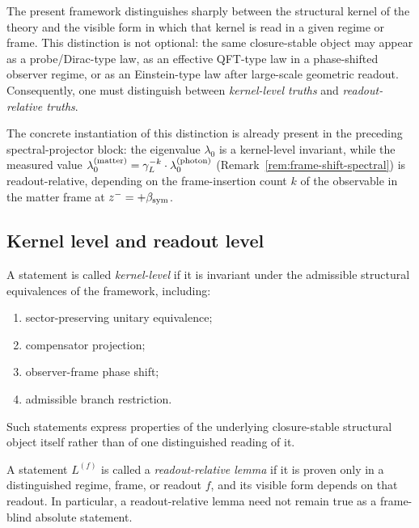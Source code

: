 The present framework distinguishes sharply between the structural kernel
of the theory and the visible form in which that kernel is read in a
given regime or frame. This distinction is not optional: the same
closure-stable object may appear as a probe/Dirac-type law, as an
effective QFT-type law in a phase-shifted observer regime, or as an
Einstein-type law after large-scale geometric readout. Consequently,
one must distinguish between \emph{kernel-level truths} and
\emph{readout-relative truths}.

The concrete instantiation of this distinction is already present in the
preceding spectral-projector block: the eigenvalue $\lambda_0$ is a
kernel-level invariant, while the measured value
$\lambda_0^{(\mathrm{matter})} = \gamma_L^{-k}\cdot\lambda_0^{(\mathrm{photon})}$
(Remark~\ref{rem:frame-shift-spectral}) is readout-relative, depending
on the frame-insertion count $k$ of the observable in the matter frame
at $z^- = +\beta_{\mathrm{sym}}$.

\subsection*{Kernel level and readout level}

\begin{definition}
\label{def:kernel-level-statement}
A statement is called \emph{kernel-level} if it is invariant under the
admissible structural equivalences of the framework, including:
\begin{enumerate}[label=(\roman*)]
  \item sector-preserving unitary equivalence;
  \item compensator projection;
  \item observer-frame phase shift;
  \item admissible branch restriction.
\end{enumerate}
Such statements express properties of the underlying closure-stable
structural object itself rather than of one distinguished reading of it.
\end{definition}

\begin{definition}
\label{def:readout-relative-lemma}
A statement $L^{(f)}$ is called a \emph{readout-relative lemma} if it
is proven only in a distinguished regime, frame, or readout $f$, and its
visible form depends on that readout. In particular, a readout-relative
lemma need not remain true as a frame-blind absolute statement.
\end{definition}

